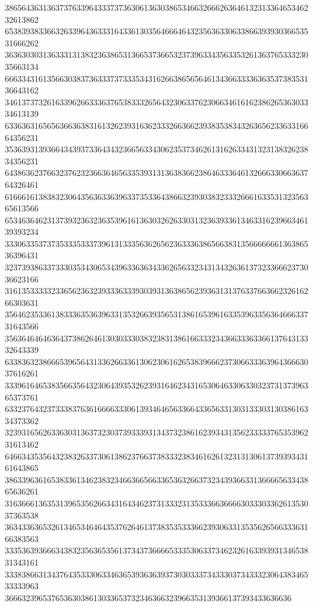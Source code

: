 38656436313637376339643337373630613630386534663266626364613231336465346232613862
65383938336632633964363331643361303564666464323563633063386639393036653531666262
36363030313633313138323638653136653736653237396334356335326136376533323035663134
66633431613566303837363337373335343162663865656461343663333636353738353136643162
34613737326163396266333637653833326564323063376230663461616238626536303334613139
63363631656563663638316132623931636233326636623938353834326365623363316664356231
35363931393664343937336434323665633430623537346261316263343132313832623834356231
64386362376632376232366364656335393131363836623864633364613266633066363764326461
61666161383832306435636336396337353364386632393038323332666163353132356365613566
65346364623137393236323635396161363032626330313236393361346331623966346139393234
33306335373735333533373961313335636265623633363865663831356666666136386536396431
32373938633733303534306534396336363433626563323431343263613732336662373036623166
31613533333233656236323933363339303931363865623936313137633766366232616266303631
35646235336138333635363963313532663935653138616539616335396335636466633731643566
35636464646364373862646130303330383238313861663332343663336336613764313332643339
63383632386665396564313362663361306230616265383966623730663336396436663037616261
33396164653835663564323064393532623931646234316530646330633032373137396365373761
63323764323733383763616666333061393464656336643365633130313330313038616334373362
32393165626336303136373230373933393134373238616239343135623333376535396231613462
64663435356432383263373061386237663738333238346162613231313061373939343161643865
38633963616538336134623832346636656633653632663732343936633136666563343865636261
31636661363531396535626634316434623731333231353336636666303330336261353037363538
36343363653261346534646435376264613738353533366239306331353562656633363166383563
33353639366634383235636535613734373666653335306337346232616339393134653831343161
33383866313437643533306334636539363639373030333734333037343332306438346533333963
36663239653765363038613033653732346366323966353139366137393433636636
